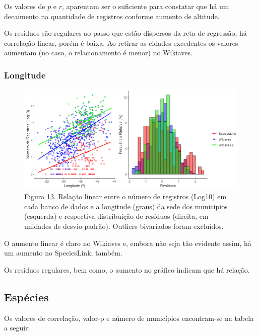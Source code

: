 \newpage

\begin{resposta}
 Os valores de $p$ e $r$, aparentam ser o suficiente para constatar que há um decaimento na quantidade de registros conforme aumento de altitude. 
 
 Os resíduos são regulares ao passo que estão dispersos da reta de regressão, há correlação linear, porém é baixa. Ao retirar as cidades excedentes os valores aumentam (no caso, o relacionamento é menor) no Wikiaves.
\end{resposta}

\subsubsection{Longitude}

\begin{figure}[h!]
\centering
\includegraphics[width = 15cm]{Imagens/G05.png}
\\{\scriptsize Figura 13. Relação linear entre o número de registros (Log10) em cada banco de dados e a longitude (graus) da sede dos municípios (esquerda) e respectiva distribuição de resíduos (direita, em unidades de desvio-padrão). Outliers bivariados foram excluídos.}
\end{figure}

 \begin{resposta}
O aumento linear é claro no Wikiaves e, embora não seja tão evidente assim, há um aumento no SpeciesLink, também.

Os resíduos regulares, bem como, o aumento no gráfico indicam que há relação.
\end{resposta}


\subsection{Espécies}

\begin{resposta}
Os valores de correlação, valor-p e número de municípios encontram-se na tabela a seguir:
\end{resposta}

